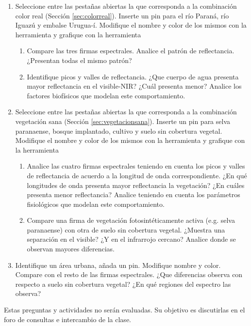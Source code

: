 \begin{enumerate}
  \item Seleccione entre las pestañas abiertas la que corresponda a la combinación color real (Sección \ref{sec:colorreal}). Inserte un pin para el río Paraná, río Iguazú y embalse Urugua-í. Modifique el nombre y color de los mismos con la herramienta  y grafique con la herramienta 
  \begin{enumerate}
      \item Compare las tres firmas espectrales. Analice el patrón de reflectancia. ¿Presentan todas el mismo patrón?
      \item Identifique picos y valles de reflectancia. ¿Que cuerpo de agua presenta mayor reflectancia en el visible-NIR? ¿Cuál presenta menor? Analice los factores biofísicos que modelan este comportamiento.
    \end{enumerate}

  \item Seleccione entre las pestañas abiertas la que corresponda a la combinación vegetación sana (Sección \ref{sec:vegetacionsana}). Inserte un pin para selva paranaense, bosque implantado, cultivo y suelo sin cobertura vegetal. Modifique el nombre y color de los mismos con la herramienta  y grafique con la herramienta 
  \begin{enumerate}
    \item Analice las cuatro firmas espectrales teniendo en cuenta los picos y valles de reflectancia de acuerdo a la longitud de onda correspondiente. ¿En qué longitudes de onda presenta mayor reflectancia la vegetación? ¿En cuáles presenta menor reflectancia? Analice teniendo en cuenta los parámetros fisiológicos que modelan este comportamiento.
    \item Compare una firma de vegetación fotosintéticamente activa (e.g. selva paranaense) con otra de suelo sin cobertura vegetal. ¿Muestra una separación en el visible? ¿Y en el infrarrojo cercano? Analice donde se observan mayores diferencias.
  \end{enumerate}
	\item Identifique un área urbana, añada un pin. Modifique nombre y color. Compare con el resto de las firmas espectrales. ¿Que diferencias observa con respecto a suelo sin cobertura vegetal? ¿En qué regiones del espectro las observa?
  \end{enumerate}

Estas preguntas y actividades no serán evaluadas. Su objetivo es discutirlas en el foro de consultas e intercambio de la clase.

